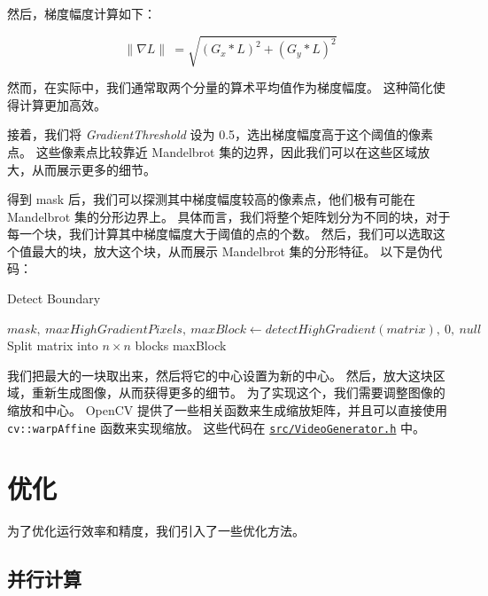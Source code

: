 \documentclass[11pt]{article}
\begin{document}
    然后，梯度幅度计算如下：

    \begin{equation}
        \label{eq:gradient_magnitude}
        \parallel \nabla L \parallel \ = \sqrt{(G_x * L)^2 + (G_y * L)^2}
    \end{equation}

    然而，在实际中，我们通常取两个分量的算术平均值作为梯度幅度。
    这种简化使得计算更加高效。

    接着，我们将 \textit{GradientThreshold} 设为 0.5，选出梯度幅度高于这个阈值的像素点。
    这些像素点比较靠近 Mandelbrot 集的边界，因此我们可以在这些区域放大，从而展示更多的细节。

    得到 mask 后，我们可以探测其中梯度幅度较高的像素点，他们极有可能在 Mandelbrot 集的分形边界上。
    具体而言，我们将整个矩阵划分为不同的块，对于每一个块，我们计算其中梯度幅度大于阈值的点的个数。
    然后，我们可以选取这个值最大的块，放大这个块，从而展示 Mandelbrot 集的分形特征。
    以下是伪代码：

    \begin{algorithm}[H]
        \SetAlgoLined
        \caption{Detect Boundary}
        \label{alg:detect_boundary}
        $mask,\ maxHighGradientPixels,\ maxBlock \leftarrow detectHighGradient(matrix),\ 0,\ null$\;
        Split matrix into $n \times n$ blocks\;
        \Return maxBlock\;
    \end{algorithm}

    我们把最大的一块取出来，然后将它的中心设置为新的中心。
    然后，放大这块区域，重新生成图像，从而获得更多的细节。
    为了实现这个，我们需要调整图像的缩放和中心。
    OpenCV 提供了一些相关函数来生成缩放矩阵，并且可以直接使用 \texttt{cv::warpAffine} 函数来实现缩放。
    这些代码在
    \href{https://github.com/AI1379/MandelbrotSet/blob/master/src/VideoGenerator.h}{\texttt{src/VideoGenerator.h}} 中。


    \section{优化}\label{sec:optimizations}

    为了优化运行效率和精度，我们引入了一些优化方法。

    \subsection{并行计算}\label{subsec:parallelism}
\end{document}
